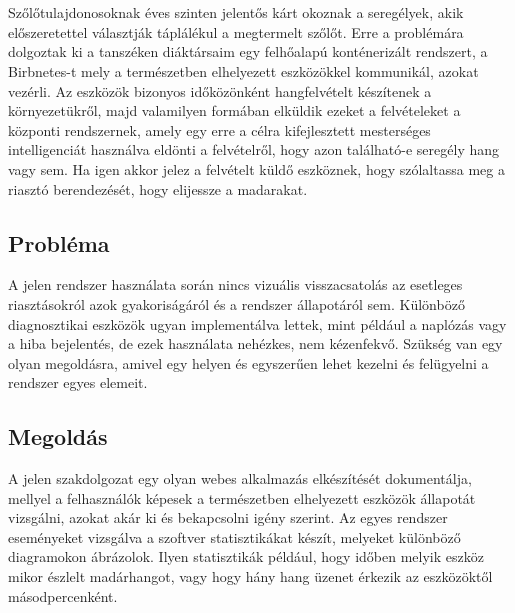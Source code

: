 \chapter{\bevezetes}
Szőlőtulajdonosoknak éves szinten jelentős kárt okoznak a seregélyek, akik előszeretettel választják táplálékul a megtermelt szőlőt.
Erre a problémára dolgoztak ki a tanszéken diáktársaim egy felhőalapú konténerizált rendszert, a Birbnetes-t
mely a természetben elhelyezett eszközökkel kommunikál, azokat vezérli.
Az eszközök bizonyos időközönként hangfelvételt készítenek a környezetükről,
majd valamilyen formában elküldik ezeket a felvételeket a központi rendszernek,
amely egy erre a célra kifejlesztett mesterséges intelligenciát használva eldönti
a felvételről, hogy azon található-e seregély hang vagy sem.
Ha igen akkor jelez a felvételt küldő eszköznek, hogy szólaltassa meg a riasztó
berendezését, hogy elijessze a madarakat.

\section{Probléma}
A jelen rendszer használata során nincs vizuális visszacsatolás az esetleges riasztásokról azok gyakoriságáról
és a rendszer állapotáról sem. Különböző diagnosztikai eszközök ugyan implementálva lettek, mint például
a naplózás vagy a hiba bejelentés, de ezek használata nehézkes, nem kézenfekvő. 
Szükség van egy olyan megoldásra, amivel egy helyen és egyszerűen lehet kezelni és felügyelni a rendszer egyes elemeit.

\section{Megoldás}
A jelen szakdolgozat egy olyan webes alkalmazás elkészítését dokumentálja, mellyel a felhasználók képesek
a természetben elhelyezett eszközök állapotát vizsgálni, azokat akár ki és bekapcsolni igény szerint.
Az egyes rendszer eseményeket vizsgálva a szoftver statisztikákat készít, melyeket különböző diagramokon ábrázolok.
Ilyen statisztikák például, hogy időben melyik eszköz mikor észlelt madárhangot, vagy hogy hány hang üzenet érkezik
az eszközöktől másodpercenként.

